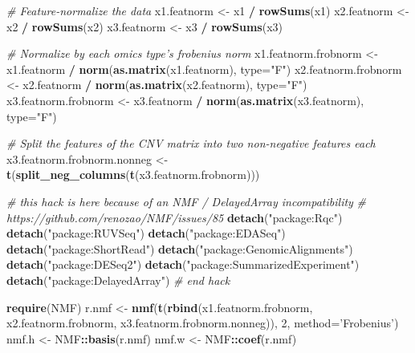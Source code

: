 \documentclass[12pt,]{krantz}
\newenvironment{Shaded}{\begin{snugshade}}{\end{snugshade}}
\newcommand{\CommentTok}[1]{\textcolor[rgb]{0.56,0.35,0.01}{\textit{#1}}}
\newcommand{\DataTypeTok}[1]{\textcolor[rgb]{0.13,0.29,0.53}{#1}}
\newcommand{\DecValTok}[1]{\textcolor[rgb]{0.00,0.00,0.81}{#1}}
\newcommand{\KeywordTok}[1]{\textcolor[rgb]{0.13,0.29,0.53}{\textbf{#1}}}
\newcommand{\NormalTok}[1]{#1}
\newcommand{\OperatorTok}[1]{\textcolor[rgb]{0.81,0.36,0.00}{\textbf{#1}}}
\newcommand{\StringTok}[1]{\textcolor[rgb]{0.31,0.60,0.02}{#1}}
\begin{document}
\begin{Shaded}
\begin{Highlighting}[]
\CommentTok{# Feature-normalize the data}
\NormalTok{x1.featnorm <-}\StringTok{ }\NormalTok{x1 }\OperatorTok{/}\StringTok{ }\KeywordTok{rowSums}\NormalTok{(x1)}
\NormalTok{x2.featnorm <-}\StringTok{ }\NormalTok{x2 }\OperatorTok{/}\StringTok{ }\KeywordTok{rowSums}\NormalTok{(x2)}
\NormalTok{x3.featnorm <-}\StringTok{ }\NormalTok{x3 }\OperatorTok{/}\StringTok{ }\KeywordTok{rowSums}\NormalTok{(x3)}

\CommentTok{# Normalize by each omics type's frobenius norm}
\NormalTok{x1.featnorm.frobnorm <-}\StringTok{ }\NormalTok{x1.featnorm }\OperatorTok{/}\StringTok{ }\KeywordTok{norm}\NormalTok{(}\KeywordTok{as.matrix}\NormalTok{(x1.featnorm), }\DataTypeTok{type=}\StringTok{"F"}\NormalTok{)}
\NormalTok{x2.featnorm.frobnorm <-}\StringTok{ }\NormalTok{x2.featnorm }\OperatorTok{/}\StringTok{ }\KeywordTok{norm}\NormalTok{(}\KeywordTok{as.matrix}\NormalTok{(x2.featnorm), }\DataTypeTok{type=}\StringTok{"F"}\NormalTok{)}
\NormalTok{x3.featnorm.frobnorm <-}\StringTok{ }\NormalTok{x3.featnorm }\OperatorTok{/}\StringTok{ }\KeywordTok{norm}\NormalTok{(}\KeywordTok{as.matrix}\NormalTok{(x3.featnorm), }\DataTypeTok{type=}\StringTok{"F"}\NormalTok{)}

\CommentTok{# Split the features of the CNV matrix into two non-negative features each}
\NormalTok{x3.featnorm.frobnorm.nonneg <-}\StringTok{ }\KeywordTok{t}\NormalTok{(}\KeywordTok{split_neg_columns}\NormalTok{(}\KeywordTok{t}\NormalTok{(x3.featnorm.frobnorm)))}

\CommentTok{# this hack is here because of an NMF / DelayedArray incompatibility}
\CommentTok{# https://github.com/renozao/NMF/issues/85}
\KeywordTok{detach}\NormalTok{(}\StringTok{"package:Rqc"}\NormalTok{)}
\KeywordTok{detach}\NormalTok{(}\StringTok{"package:RUVSeq"}\NormalTok{)}
\KeywordTok{detach}\NormalTok{(}\StringTok{"package:EDASeq"}\NormalTok{)}
\KeywordTok{detach}\NormalTok{(}\StringTok{"package:ShortRead"}\NormalTok{)}
\KeywordTok{detach}\NormalTok{(}\StringTok{"package:GenomicAlignments"}\NormalTok{)}
\KeywordTok{detach}\NormalTok{(}\StringTok{"package:DESeq2"}\NormalTok{)}
\KeywordTok{detach}\NormalTok{(}\StringTok{"package:SummarizedExperiment"}\NormalTok{)}
\KeywordTok{detach}\NormalTok{(}\StringTok{"package:DelayedArray"}\NormalTok{)}
\CommentTok{# end hack}

\KeywordTok{require}\NormalTok{(NMF)}
\NormalTok{r.nmf <-}\StringTok{ }\KeywordTok{nmf}\NormalTok{(}\KeywordTok{t}\NormalTok{(}\KeywordTok{rbind}\NormalTok{(x1.featnorm.frobnorm, x2.featnorm.frobnorm, x3.featnorm.frobnorm.nonneg)), }\DecValTok{2}\NormalTok{, }\DataTypeTok{method=}\StringTok{'Frobenius'}\NormalTok{)}
\NormalTok{nmf.h <-}\StringTok{ }\NormalTok{NMF}\OperatorTok{::}\KeywordTok{basis}\NormalTok{(r.nmf)}
\NormalTok{nmf.w <-}\StringTok{ }\NormalTok{NMF}\OperatorTok{::}\KeywordTok{coef}\NormalTok{(r.nmf)}


\end{Highlighting}
\end{Shaded}
\end{document}
